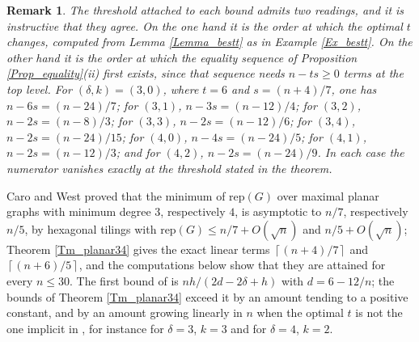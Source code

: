\documentclass[12pt,a4paper]{article}%
\newtheorem{remark}[theorem]{Remark}
\begin{document}
\begin{remark}
\label{Rem_thresholds}The threshold attached to each bound admits two
readings, and it is instructive that they agree. On the one hand it is the
order at which the optimal $t$ changes, computed from Lemma \ref{Lemma_bestt} as
in Example \ref{Ex_bestt}. On the other hand it is the order at which the
equality sequence of Proposition \ref{Prop_equality}(ii) first exists, since
that sequence needs $n-ts\geq 0$ terms at the top level. For
$(\delta ,k)=(3,0)$, where $t=6$ and $s=(n+4)/7$, one has $n-6s=(n-24)/7$; for
$(3,1)$, $n-3s=(n-12)/4$; for $(3,2)$, $n-2s=(n-8)/3$; for $(3,3)$,
$n-2s=(n-12)/6$; for $(3,4)$, $n-2s=(n-24)/15$; for $(4,0)$, $n-4s=(n-24)/5$;
for $(4,1)$, $n-2s=(n-12)/3$; and for $(4,2)$, $n-2s=(n-24)/9$. In each case
the numerator vanishes exactly at the threshold stated in the theorem.
\end{remark}



Caro and West \cite[Theorem 2.5]{CaroWest} proved that the minimum of $\mathrm{rep}(G)$ over
maximal planar graphs with minimum degree $3$, respectively $4$, is asymptotic to $n/7$, respectively
$n/5$, by hexagonal tilings with $\mathrm{rep}(G)\leq n/7+O(\sqrt{n})$ and $n/5+O(\sqrt{n})$;
Theorem \ref{Tm_planar34} gives the exact linear terms $\left\lceil (n+4)/7\right\rceil $ and
$\left\lceil (n+6)/5\right\rceil $, and the computations below show that they are attained for every
$n\leq 30$. The first bound of \cite[Theorem 2.1(1)]{CaroLauriZarb} is $nh/(2d-2\delta +h)$ with
$d=6-12/n$; the bounds of Theorem \ref{Tm_planar34} exceed it by an amount tending to a positive
constant, and by an amount growing linearly in $n$ when the optimal $t$ is not the one implicit in
\cite{CaroLauriZarb}, for instance for $\delta =3$, $k=3$ and for $\delta =4$, $k=2$.
\end{document}
